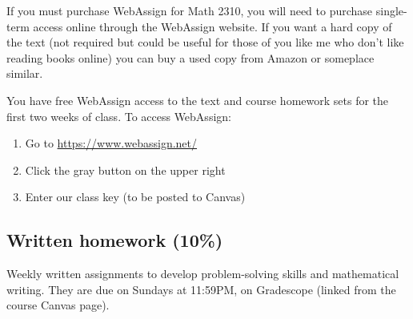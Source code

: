 \documentclass[oneside,11pt]{amsart}
\begin{document}
If you must purchase WebAssign for Math 2310, you will need to purchase single-term access online through the WebAssign website. If you want a hard copy of the text (not required but could be useful for those of you like me who don't like reading books online) you can buy a used copy from Amazon or someplace similar.

You have free WebAssign access to the text and course homework sets for the first two weeks of class. To access WebAssign:

\begin{enumerate}
    \item Go to \url{https://www.webassign.net/}
    \item Click the gray button on the upper right
		\item Enter our class key (to be posted to Canvas)
\end{enumerate}


\subsection{Written homework (10\%)} Weekly written assignments to develop problem-solving skills and mathematical writing. They are due on Sundays at 11:59PM, on Gradescope (linked from the course Canvas page).
\end{document}
